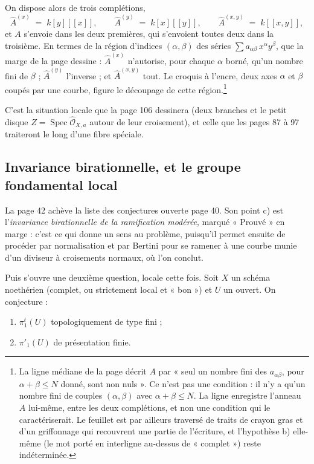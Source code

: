 \documentclass[11pt,a4paper]{article}
\begin{document}
On dispose alors de trois complétions,
\[
  \hat{A}^{(x)} \;=\; k[y][[x]] , \qquad
  \hat{A}^{(y)} \;=\; k[x][[y]] , \qquad
  \hat{A}^{(x,y)} \;=\; k[[x,y]] ,
\]
et $A$ s'envoie dans les deux premières, qui s'envoient toutes deux dans la
troisième. En termes de la région d'indices $(\alpha, \beta)$ des séries
$\sum a_{\alpha\beta}\, x^{\alpha} y^{\beta}$, que la marge de la page
dessine : $\hat{A}^{(x)}$ n'autorise, pour chaque $\alpha$ borné, qu'un nombre
fini de $\beta$ ; $\hat{A}^{(y)}$ l'inverse ; et $\hat{A}^{(x,y)}$ tout.
Le croquis à l'encre, deux axes $\alpha$ et $\beta$ coupés par une courbe,
figure le découpage de cette région.\footnote{La ligne médiane de la
page décrit $A$ par « seul un nombre fini des $a_{\alpha\beta}$, pour
$\alpha + \beta \leqslant N$ donné, sont non nuls ». Ce n'est pas une
condition : il n'y a qu'un nombre fini de couples $(\alpha,\beta)$ avec
$\alpha+\beta \leqslant N$. La ligne enregistre l'anneau $A$ lui-même, entre
les deux complétions, et non une condition qui le caractériserait. Le feuillet
est par ailleurs traversé de traits de crayon gras et d'un griffonnage qui
recouvrent une partie de l'écriture, et l'hypothèse b) elle-même (le mot
porté en interligne au-dessus de « complet ») reste indéterminée.}

C'est la situation locale que la page 106 dessinera (deux branches et le
petit disque $Z = \operatorname{Spec}\hat{\mathcal{O}}_{X,a}$ autour de leur
croisement), et celle que les pages 87 à 97 traiteront le long d'une fibre
spéciale.

\subsection*{Invariance birationnelle, et le groupe fondamental local}

La page 42 achève la liste des conjectures ouverte page 40. Son point c) est
l'\emph{invariance birationnelle de la ramification modérée}, marqué « Prouvé »
en marge : c'est ce qui donne un sens au problème, puisqu'il permet ensuite
de procéder par normalisation et par Bertini pour se ramener à une courbe munie
d'un diviseur à croisements normaux, où l'on conclut.

Puis s'ouvre une deuxième question, locale cette fois. Soit $X$ un schéma
noethérien (complet, ou strictement local et « bon ») et $U$ un ouvert.
On conjecture :

\begin{enumerate}
  \item[a)] $\pi^{t}_{1}(U)$ topologiquement de type fini ;
  \item[b)] $\pi'_{1}(U)$ de présentation finie.
\end{enumerate}
\end{document}
